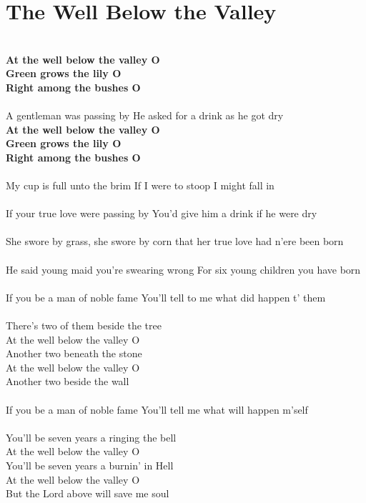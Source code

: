 \documentclass[letterpaper,9pt]{article}
\begin{document}
\section{The Well Below the Valley}
\noindent
\Large
\\\textbf{At the well below the valley O
\\Green grows the lily O
\\Right among the bushes O}
\\
\\A gentleman was passing by He asked for a drink as he got dry
\\\textbf{At the well below the valley O
\\Green grows the lily O
\\Right among the bushes O}
\\
\\My cup is full unto the brim If I were to stoop I might fall in
\\
\\If your true love were passing by You'd give him a drink if he were dry
\\
\\She swore by grass, she swore by corn that her true love had n'ere been born
\\
\\He said young maid you're swearing wrong For six young children you have born
\\
\\If you be a man of noble fame You'll tell to me what did happen t' them
\\
\\There's two of them beside the tree
\\At the well below the valley O
\\Another two beneath the stone
\\At the well below the valley O
\\Another two beside the wall
\\
\\If you be a man of noble fame You'll tell me what will happen m'self
\\
\\You'll be seven years a ringing the bell
\\At the well below the valley O
\\You'll be seven years a burnin' in Hell
\\At the well below the valley O
\\But the Lord above will save me soul
\end{document}
